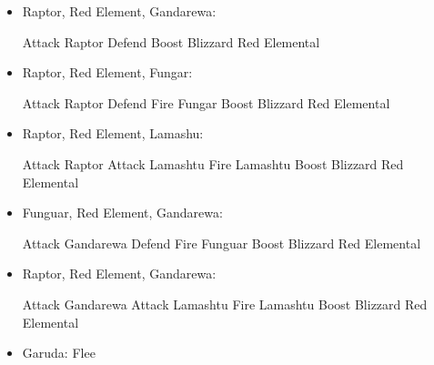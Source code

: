 \begin{multicols}{2}
\begin{encounters}
  \begin{itemize} %
    \item Raptor, Red Element, Gandarewa:
          \begin{itemize}
            \wakkaf Attack Raptor
            \kimahrif Defend
            \summon{\valefor}
            \valeforf Boost
            \valeforf Blizzard Red Elemental
          \end{itemize}
    \item Raptor, Red Element, Fungar:
          \begin{itemize}
            \wakkaf Attack Raptor
            \kimahrif Defend
            \summon{\valefor}
            \valeforf Fire Fungar
            \valeforf Boost
            \valeforf Blizzard Red Elemental
          \end{itemize}
    \item Raptor, Red Element, Lamashu:
          \begin{itemize}
            \wakkaf Attack Raptor
            \kimahrif Attack Lamashtu
            \summon{\valefor}
            \valeforf Fire Lamashtu
            \valeforf Boost
            \valeforf Blizzard Red Elemental
          \end{itemize}
    \item Funguar, Red Element, Gandarewa:
          \begin{itemize}
            \wakkaf Attack Gandarewa
            \kimahrif Defend
            \summon{\valefor}
            \valeforf Fire Funguar
            \valeforf Boost
            \valeforf Blizzard Red Elemental
          \end{itemize}
    \item Raptor, Red Element, Gandarewa:
          \begin{itemize}
            \wakkaf Attack Gandarewa
            \kimahrif Attack Lamashtu
            \summon{\valefor}
            \valeforf Fire Lamashtu
            \valeforf Boost
            \valeforf Blizzard Red Elemental
          \end{itemize}
    \item Garuda: Flee

\end{itemize}
\end{encounters}
\end{multicols}
